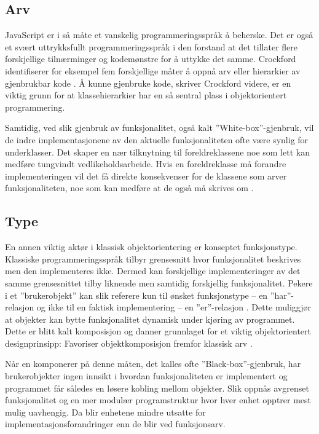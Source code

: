 \documentclass[norsk]{article}
\begin{document}
\subsection{Arv}
JavaScript er i så måte et vanskelig programmeringsspråk å beherske. Det er også et svært uttrykksfullt programmeringsspråk i den forstand at det tillater flere forskjellige tilnærminger og kodemønstre for å uttykke det samme\parencite[s. xxii]{harmes}. Crockford identifiserer for eksempel fem forskjellige måter å oppnå arv eller hierarkier av gjenbrukbar kode \parencite{crockfordInheritance}. Å kunne gjenbruke kode, skriver Crockford videre, er en viktig grunn for at klassehierarkier har en så sentral plass i objektorientert programmering. 

Samtidig, ved slik gjenbruk av funksjonalitet, også kalt ”White-box”-gjenbruk, vil de indre implementasjonene av den aktuelle funksjonaliteten ofte være synlig for underklasser. Det skaper en nær tilknytning til foreldreklassene noe som lett kan medføre tungvindt vedlikeholdsarbeide. Hvis en foreldreklasse må forandre implementeringen vil det få direkte konsekvenser for de klassene som arver funksjonaliteten, noe som kan medføre at de også må skrives om \parencite[s. 31]{gamma}. 
\subsection{Type}
En annen viktig aktør i klassisk objektorientering er konseptet funksjonstype. Klassiske programmeringsspråk tilbyr grensesnitt hvor funksjonalitet beskrives men den implementeres ikke. Dermed kan forskjellige implementeringer av det samme grensesnittet tilby liknende men samtidig forskjellig funksjonalitet. Pekere i et ”brukerobjekt” kan slik referere kun til ønsket funksjonstype – en ”har”-relasjon og ikke til en faktisk implementering – en ”er”-relasjon \parencite[s. 23]{freeman}. Dette muliggjør at objekter kan bytte funksjonalitet dynamisk under kjøring av programmet. Dette er blitt kalt komposisjon og danner grunnlaget for et viktig objektorientert designprinsipp: Favoriser objektkomposisjon fremfor klassisk arv \parencite[s. 32]{gamma}.

Når en komponerer på denne måten, det kalles ofte ”Black-box”-gjenbruk, har brukerobjekter ingen innsikt i hvordan funksjonaliteten er implementert og programmet får således en løsere kobling mellom objekter. Slik oppnås avgrenset funksjonalitet og en mer modulær programstruktur hvor hver enhet opptrer mest mulig uavhengig. Da blir enhetene mindre utsatte for implementasjonsforandringer enn de blir ved funksjonsarv. 
\end{document}
